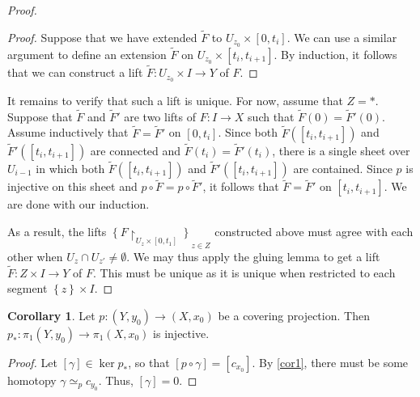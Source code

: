 \documentclass[10pt,letterpaper,cm]{nupset}
\theoremstyle{definition}
\theoremstyle{theorem}
\newtheorem{corollary}[definition]{Corollary}
\theoremstyle{remark}
\newcommand{\1}{\mathbb{1}}
\newcommand{\0}{\vec 0}
\begin{document}
\begin{proof}
\begin{proof}
 Suppose that we have extended $\widetilde{F}$ to $U_{z_0} \times [0,t_i]$. We can use a similar argument to define an extension $\widetilde{F}$ on $U_{z_0} \times [t_i, t_{i+1}]$.  By induction, it follows that we can construct a lift $\tilde{F} : U_{z_0} \times I \to Y$ of $F$.
\end{proof}
 It remains to verify that such a lift is unique. For now, assume that $Z= \ast$. Suppose that $\widetilde{F}$ and $\widetilde{F}'$ are two lifts of $F: I \to X$ such that $\widetilde{F}(0) = \widetilde{F}'(0)$. Assume inductively that $\widetilde{F} = \widetilde{F}'$ on $\left[0,t_i\right]$. Since both $\widetilde{F}([t_i, t_{i+1}])$ and $\widetilde{F}'([t_i, t_{i+1}])$ are connected and $\widetilde{F}(t_i) = \widetilde{F}'(t_i)$, there is a single sheet over $U_{i-1}$ in which both $\widetilde{F}([t_i, t_{i+1}])$ and $\widetilde{F}'([t_i, t_{i+1}])$ are contained. Since $p$ is injective on this sheet and $p\circ \widetilde{F} = p \circ \widetilde{F}'$, it follows that $\widetilde{F} = \widetilde{F}'$ on $\left[t_i, t_{i+1}\right]$. We are done with our induction.


 As a result, the  lifts  $\left\{F \restriction_{U_{z} \times [0, t_1]}\right\}_{z\in Z}$ constructed above must agree with each other when $U_z \cap U_{z'} \ne \emptyset$. We may thus apply the gluing lemma to get a lift $\tilde{F} : Z \times I \to Y$ of $F$. This must be unique as it is unique when restricted to each segment $\left\{z\right\} \times I$.
\end{proof}

\begin{corollary}
Let $p: \left(Y, y_0\right) \to \left(X, x_0\right)$  be a covering projection. Then $p_{\ast} : \pi_1\left(Y, y_0\right) \to \pi_1\left(X, x_0\right)$ is injective. 
\end{corollary}
\begin{proof}
Let $\left[\gamma\right] \in \ker{p_{\ast}}$, so that $\left[p\circ \gamma\right] = \left[c_{x_0}\right]$. By \cref{cor1}, there must be some homotopy $\gamma \simeq_p c_{y_0}$. Thus, $\left[\gamma\right] = 0$.
\end{proof}
\end{document}
